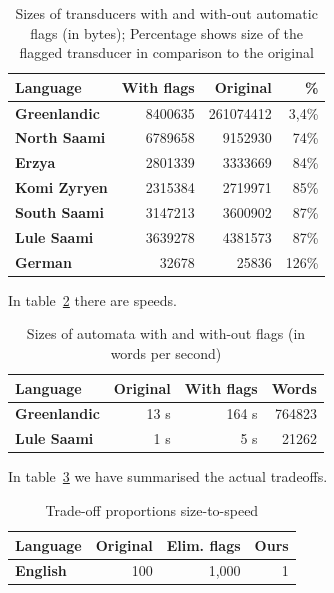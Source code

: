 \documentclass[11pt]{article}
\begin{document}
\begin{table}
    \centering
    \begin{tabular}{|l|r|r|r|}
        \hline
        \bf Language & \bf With flags & \bf Original & \bf \% \\
        \hline
        \bf Greenlandic & 8400635 & 261074412 & 3,4\%  \\
        \bf North Saami & 6789658 & 9152930 & 74\%  \\
        \bf Erzya & 2801339 & 3333669 & 84\%  \\
        \bf Komi Zyryen & 2315384 & 2719971 & 85\%  \\
        \bf South Saami & 3147213 & 3600902 & 87\%  \\
        \bf Lule Saami & 3639278 & 4381573 & 87\%  \\
        \bf German & 32678 & 25836 & 126\%  \\
        \hline
    \end{tabular}
    \caption{Sizes of transducers with and with-out automatic flags (in bytes); Percentage shows size of the flagged transducer in comparison to the original
    \label{table:sizes}}
\end{table}


In table~\ref{table:speed} there are speeds.

\begin{table}
    \centering
    \begin{tabular}{|l|r|r|r|}
        \hline
        \bf Language & \bf Original & \bf With flags & \bf Words \\
        \hline
        \bf Greenlandic & 13 s & 164 s  & 764823  \\
        \bf Lule Saami & 1 s & 5 s  & 21262  \\
        \hline
    \end{tabular}
    \caption{Sizes of automata with and with-out flags (in words per second)
    \label{table:speed}}
\end{table}

In table~\ref{table:tradeoff} we have summarised the actual tradeoffs.

\begin{table}
    \centering
    \begin{tabular}{|l|r|r|r|}
        \hline
        \bf Language & \bf Original & \bf Elim. flags & \bf Ours \\
        \hline
        \bf English & 100 & 1,000 & 1  \\
        \hline
    \end{tabular}
    \caption{Trade-off proportions size-to-speed
    \label{table:tradeoff}}
\end{table}
\end{document}
